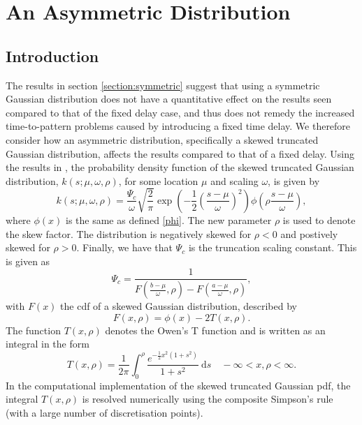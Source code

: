 \section{An Asymmetric Distribution}
\subsection{Introduction}
The results in section \ref{section:symmetric} suggest that using a symmetric Gaussian distribution does not have a quantitative effect on the results seen compared to that of the fixed delay case, and thus does not remedy the increased time-to-pattern problems caused by introducing a fixed time delay. We therefore consider how an asymmetric distribution, specifically a skewed truncated Gaussian distribution, affects the results compared to that of a fixed delay. Using the results in \cite{skewed}, the probability density function of the skewed truncated Gaussian distribution, $k(s;\mu,\omega,\rho)$, for some location $\mu$ and scaling $\omega$, is given by
\begin{equation}
    k(s;\mu,\omega,\rho)=\frac{\Psi_c}{\omega}\sqrt{\frac{2}{\pi}}\exp\left(-\frac{1}{2}\left(\frac{s-\mu}{\omega}\right)^2\right)\phi\left(\rho\frac{s-\mu}{\omega}\right),
\end{equation}
where $\phi(x)$ is the same as defined \eqref{phi}. The new parameter $\rho$ is used to denote the skew factor. The distribution is negatively skewed for $\rho<0$ and postively skewed for $\rho>0$. Finally, we have that $\Psi_c$ is the truncation scaling constant. This is given as
\begin{equation}
    \Psi_c=\frac{1}{F\left(\frac{b-\mu}{\omega},\rho\right)-F\left(\frac{a-\mu}{\omega},\rho\right)},
\end{equation}
with $F(x)$ the cdf of a skewed Gaussian distribution, described by
\begin{equation}
    F(x,\rho)=\phi(x)-2T(x,\rho).
\end{equation}
The function $T(x,\rho)$ denotes the Owen's T function \cite{owenst} and is written as an integral in the form
\begin{equation}
    T(x,\rho)=\frac{1}{2\pi}\int_0^\rho\frac{e^{-\frac{1}{2}x^2(1+s^2)}}{1+s^2}\ \text{d}s\quad -\infty<x,\rho<\infty.
\end{equation}
In the computational implementation of the skewed truncated Gaussian pdf, the integral $T(x,\rho)$ is resolved numerically using the composite Simpson's rule (with a large number of discretisation points).

